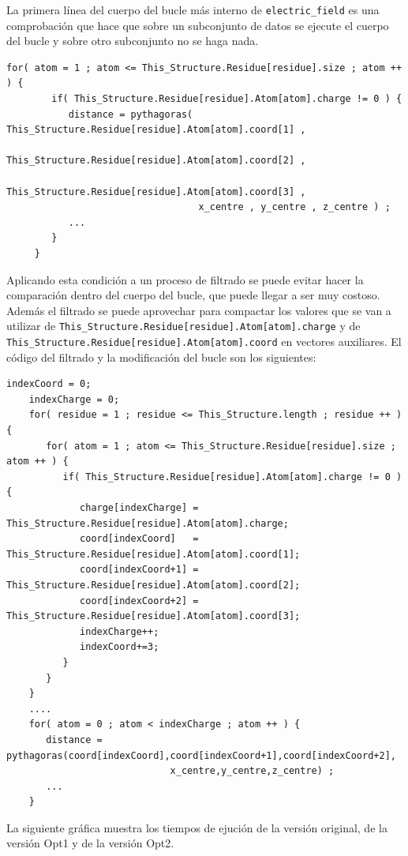La primera l\'{i}nea del cuerpo del bucle m\'{a}s interno de
\texttt{electric\_field} es una comprobaci\'{o}n que hace que sobre un
subconjunto de datos se ejecute el cuerpo del bucle y sobre otro subconjunto no
se haga nada.

\begin{lstlisting}[]
     for( atom = 1 ; atom <= This_Structure.Residue[residue].size ; atom ++ ) {
        if( This_Structure.Residue[residue].Atom[atom].charge != 0 ) {
           distance = pythagoras( This_Structure.Residue[residue].Atom[atom].coord[1] ,
                                  This_Structure.Residue[residue].Atom[atom].coord[2] ,
                                  This_Structure.Residue[residue].Atom[atom].coord[3] ,
                                  x_centre , y_centre , z_centre ) ;
           ...
        }
     }
\end{lstlisting}

Aplicando esta condici\'{o}n a un proceso de filtrado se puede evitar hacer la
comparaci\'{o}n dentro del cuerpo del bucle, que puede llegar a ser muy costoso.
Adem\'{a}s el filtrado se puede aprovechar para compactar los valores que se van
a utilizar de \texttt{This\_Structure.Residue[residue].Atom[atom].charge} y de
\texttt{This\_Structure.Residue[residue].Atom[atom].coord} en vectores
auxiliares. El c\'{o}digo del filtrado y la modificaci\'{o}n del bucle son los
siguientes:

\begin{lstlisting}[]
    indexCoord = 0;
    indexCharge = 0;
    for( residue = 1 ; residue <= This_Structure.length ; residue ++ ) {
       for( atom = 1 ; atom <= This_Structure.Residue[residue].size ; atom ++ ) {
          if( This_Structure.Residue[residue].Atom[atom].charge != 0 ) {
             charge[indexCharge] = This_Structure.Residue[residue].Atom[atom].charge;
             coord[indexCoord]   = This_Structure.Residue[residue].Atom[atom].coord[1];
             coord[indexCoord+1] = This_Structure.Residue[residue].Atom[atom].coord[2];
             coord[indexCoord+2] = This_Structure.Residue[residue].Atom[atom].coord[3];
             indexCharge++;
             indexCoord+=3;
          }
       }
    }
    ....
    for( atom = 0 ; atom < indexCharge ; atom ++ ) {
       distance = pythagoras(coord[indexCoord],coord[indexCoord+1],coord[indexCoord+2],
                             x_centre,y_centre,z_centre) ;
       ...
    }
\end{lstlisting}

La siguiente gr\'{a}fica muestra los tiempos de ejuci\'{o}n de la versi\'{o}n
original, de la versi\'{o}n Opt1 y de la versi\'{o}n Opt2.


